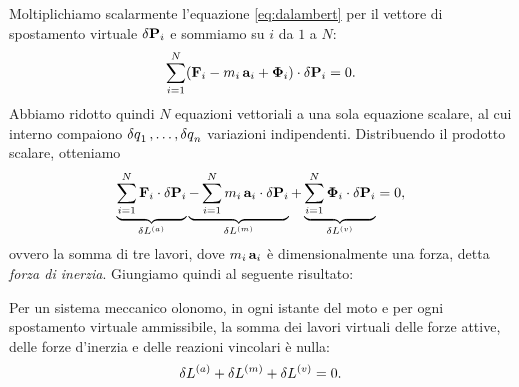 Moltiplichiamo scalarmente l'equazione \eqref{eq:dalambert} per il vettore di spostamento virtuale $\var{\vb{P}}_i$ e sommiamo su $i$ da $1$ a $N$:
\begin{equation*}
    \sum_{i=1}^N (\vb{F}_i - m_i\,\vb{a}_i + \vb{\Phi}_i)\cdot \var{\vb{P}}_i = 0.
\end{equation*}
Abbiamo ridotto quindi $N$ equazioni vettoriali a una sola equazione scalare, al cui interno compaiono $\var{q}_1, \dots, \var{q}_n$ variazioni indipendenti.
Distribuendo il prodotto scalare, otteniamo
\begin{equation*}
    \underbrace{\sum_{i=1}^N \vb{F}_i\cdot \var{\vb{P}}_i}_{\var{L^{(a)}}}  \underbrace{-\sum_{i=1}^N m_i\,\vb{a}_i\cdot \var{\vb{P}}_i}_{\var{L^{(m)}}} + \underbrace{\sum_{i=1}^N \vb{\Phi}_i\cdot \var{\vb{P}}_i}_{\var{L^{(v)}}} = 0,
\end{equation*}
ovvero la somma di tre lavori, dove $m_i\,\vb{a}_i$ è dimensionalmente una forza, detta \emph{forza di inerzia}. Giungiamo quindi al seguente risultato:

\begin{theorem}
    Per un sistema meccanico olonomo, in ogni istante del moto e per ogni spostamento virtuale ammissibile, la somma dei lavori virtuali delle forze attive, delle forze d'inerzia e delle reazioni vincolari è nulla:
    \begin{equation*}
        \var{L^{(a)}} + \var{L^{(m)}} + \var{L^{(v)}} = 0.
    \end{equation*}
\end{theorem}

